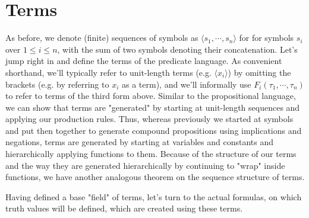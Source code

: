 \documentclass{article}
\begin{document}
\section{Terms}
As before, we denote (finite) sequences of symbols as $ \langle s_1, \cdots, s_n \rangle $ for for symbols $ s_i $ over $ 1 \leq i \leq n $, with the sum of two symbols denoting their concatenation. Let's jump right in and define the terms of the predicate language.
\n
As convenient shorthand, we'll typically refer to unit-length terms (e.g. $ \langle x_i \rangle $) by omitting the brackets (e.g. by referring to $ x_i $ as a term), and we'll informally use $ F_i(\tau_1, \cdots, \tau_n) $ to refer to terms of the third form above. Similar to the propositional language, we can show that terms are "generated" by starting at unit-length sequences and applying our production rules. Thus, whereas previously we started at symbols and put then together to generate compound propositions using implications and negations, terms are generated by starting at variables and constants and hierarchically applying functions to them.
Because of the structure of our terms and the way they are generated hierarchically by continuing to "wrap" inside functions, we have another analogous theorem on the sequence structure of terms.

Having defined a base "field" of terms, let's turn to the actual formulas, on which truth values will be defined, which are created using these terms.
\end{document}
